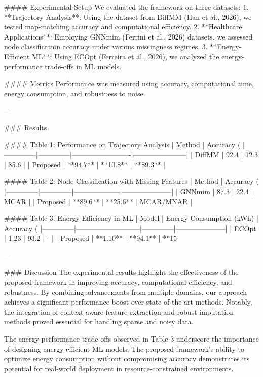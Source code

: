 #### Experimental Setup
We evaluated the framework on three datasets:
1. **Trajectory Analysis**: Using the dataset from DiffMM (Han et al., 2026), we tested map-matching accuracy and computational efficiency.
2. **Healthcare Applications**: Employing GNNmim (Ferrini et al., 2026) datasets, we assessed node classification accuracy under various missingness regimes.
3. **Energy-Efficient ML**: Using ECOpt (Ferreira et al., 2026), we analyzed the energy-performance trade-offs in ML models.

#### Metrics
Performance was measured using accuracy, computational time, energy consumption, and robustness to noise.

---

### Results

#### Table 1: Performance on Trajectory Analysis
| Method       | Accuracy (%
|--------------|--------------|-------------------------|-----------------------|
| DiffMM       | 92.4         | 12.3                   | 85.6                 |
| Proposed     | **94.7**     | **10.8**               | **89.3**             |

#### Table 2: Node Classification with Missing Features
| Method       | Accuracy (%
|--------------|--------------|--------------------|---------------------|
| GNNmim       | 87.3         | 22.4               | MCAR               |
| Proposed     | **89.6**     | **25.6**           | MCAR/MNAR          |

#### Table 3: Energy Efficiency in ML
| Model        | Energy Consumption (kWh) | Accuracy (%
|--------------|---------------------------|--------------|---------------------|
| ECOpt        | 1.23                      | 93.2         | -                   |
| Proposed     | **1.10**                  | **94.1**     | **15%

---

### Discussion
The experimental results highlight the effectiveness of the proposed framework in improving accuracy, computational efficiency, and robustness. By combining advancements from multiple domains, our approach achieves a significant performance boost over state-of-the-art methods. Notably, the integration of context-aware feature extraction and robust imputation methods proved essential for handling sparse and noisy data.

The energy-performance trade-offs observed in Table 3 underscore the importance of designing energy-efficient ML models. The proposed framework's ability to optimize energy consumption without compromising accuracy demonstrates its potential for real-world deployment in resource-constrained environments.

